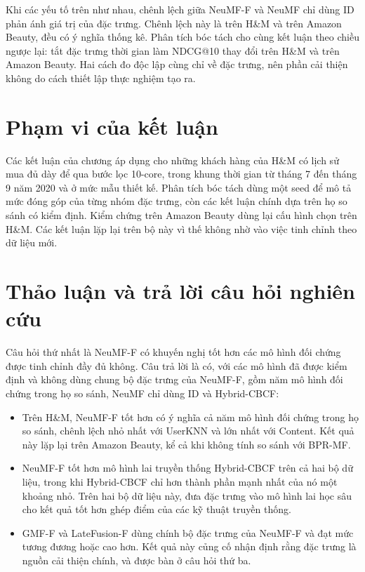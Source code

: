 Khi các yếu tố trên như nhau, chênh lệch giữa NeuMF-F và NeuMF chỉ dùng ID phản ánh giá trị của đặc trưng. Chênh lệch này là  trên H\&M và  trên Amazon Beauty, đều có ý nghĩa thống kê. Phân tích bóc tách cho cùng kết luận theo chiều ngược lại: tắt đặc trưng thời gian làm NDCG@10 thay đổi  trên H\&M và  trên Amazon Beauty. Hai cách đo độc lập cùng chỉ về đặc trưng, nên phần cải thiện không do cách thiết lập thực nghiệm tạo ra.

\section{Phạm vi của kết luận}
\label{sec:pham_vi_thuc_nghiem}

Các kết luận của chương áp dụng cho những khách hàng của H\&M có lịch sử mua đủ dày để qua bước lọc 10-core, trong khung thời gian từ tháng 7 đến tháng 9 năm 2020 và ở mức mẫu thiết kế. Phân tích bóc tách dùng một seed để mô tả mức đóng góp của từng nhóm đặc trưng, còn các kết luận chính dựa trên họ so sánh có kiểm định. Kiểm chứng trên Amazon Beauty dùng lại cấu hình chọn trên H\&M. Các kết luận lặp lại trên bộ này vì thế không nhờ vào việc tinh chỉnh theo dữ liệu mới.

\section{Thảo luận và trả lời câu hỏi nghiên cứu}
\label{sec:discussion}

Câu hỏi thứ nhất là NeuMF-F có khuyến nghị tốt hơn các mô hình đối chứng được tinh chỉnh đầy đủ không. Câu trả lời là có, với các mô hình đã được kiểm định và không dùng chung bộ đặc trưng của NeuMF-F, gồm năm mô hình đối chứng trong họ so sánh, NeuMF chỉ dùng ID và Hybrid-CBCF:
\begin{itemize}
    \item Trên H\&M, NeuMF-F tốt hơn có ý nghĩa cả năm mô hình đối chứng trong họ so sánh, chênh lệch nhỏ nhất với UserKNN và lớn nhất với Content. Kết quả này lặp lại trên Amazon Beauty, kể cả khi không tính so sánh với BPR-MF.
    \item NeuMF-F tốt hơn mô hình lai truyền thống Hybrid-CBCF trên cả hai bộ dữ liệu, trong khi Hybrid-CBCF chỉ hơn thành phần mạnh nhất của nó một khoảng nhỏ. Trên hai bộ dữ liệu này, đưa đặc trưng vào mô hình lai học sâu cho kết quả tốt hơn ghép điểm của các kỹ thuật truyền thống.
    \item GMF-F và LateFusion-F dùng chính bộ đặc trưng của NeuMF-F và đạt mức tương đương hoặc cao hơn. Kết quả này củng cố nhận định rằng đặc trưng là nguồn cải thiện chính, và được bàn ở câu hỏi thứ ba.
\end{itemize}

